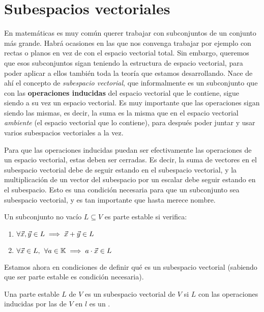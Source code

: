 \documentclass[../algebra_lineal.tex]{subfiles}
\begin{document}
\section{Subespacios vectoriales}

En matemáticas es muy común querer trabajar con subconjuntos de un conjunto más grande. Habrá ocasiones en las que nos convenga trabajar por ejemplo con rectas o planos en vez de con el espacio vectorial total. Sin embargo, queremos que esos subconjuntos sigan teniendo la estructura de espacio vectorial, para poder aplicar a ellos también toda la teoría que estamos desarrollando. Nace de ahí el concepto de \textit{subespacio vectorial}, que informalmente es un subconjunto que con las \textbf{operaciones inducidas} del espacio vectorial que le contiene, sigue siendo a su vez un espacio vectorial. Es muy importante que las operaciones sigan siendo las mismas, es decir, la suma es la misma que en el espacio vectorial \textit{ambiente} (el espacio vectorial que lo contiene), para después poder juntar y usar varios subespacios vectoriales a la vez.

Para que las operaciones inducidas puedan ser efectivamente las operaciones de un espacio vectorial, estas deben ser cerradas. Es decir, la suma de vectores en el subespacio vectorial debe de seguir estando en el subespacio vectorial, y la multiplicación de un vector del subespacio por un escalar debe seguir estando en el subespacio. Esto es una condición necesaria para que un subconjunto sea subespacio vectorial, y es tan importante que hasta merece nombre.

\begin{definition}
    Un subconjunto no vacío $L\subseteq V$ es parte estable si verifica:
    \begin{enumerate}
        \item $\forall \vec{x}, \vec{y} \in L \implies \vec{x} + \vec{y} \in L$
        \item $\forall \vec{x} \in L, \hspace{1.5mm} \forall a \in \mathbb{K} \implies a\cdot \vec{x} \in L$
    \end{enumerate}
\end{definition}

Estamos ahora en condiciones de definir qué es un subespacio vectorial (sabiendo que ser parte estable es condición necesaria).

\begin{definition}
    Una parte estable $L$ de $V$ es un subespacio vectorial de $V$ si $L$ con las operaciones inducidas por las de $V$ en $l$ es un \kvspace.
\end{definition}
\end{document}
